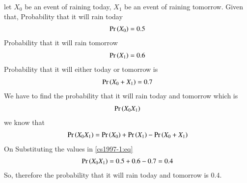 let $X_{0}$ be an event of raining today, $X_{1}$ be an event of raining tomorrow.  
Given that,
Probability that it will rain today
\begin{align}
\Pr\left(X_{0}\right) = 0.5
\end{align}
Probability that it will rain tomorrow
\begin{align}
\Pr\left(X_{1}\right) = 0.6
\end{align}
Probability that it will either today or tomorrow is 
\begin{align}
    \Pr\left(X_{0} +X_{1}\right) =0.7
\end{align}
We have to find the probability that it will rain today and tomorrow which is
\begin{align}
\Pr\left(X_{0}X_{1}\right)
\end{align}
we know that 
\begin{align}
\label{cs1997-1:eq}\pr{X_{0}X_{1}}= \pr{X_{0}} + \pr{X_{1}} - \pr{X_{0}+X_{1}}
\end{align}
On Substituting the values in \eqref{cs1997-1:eq}
\begin{align}
\Pr\left(X_{0}X_{1}\right)= 0.5 + 0.6 - 0.7 = 0.4
\end{align}
So, therefore the probability that it will rain today and tomorrow is 0.4.
